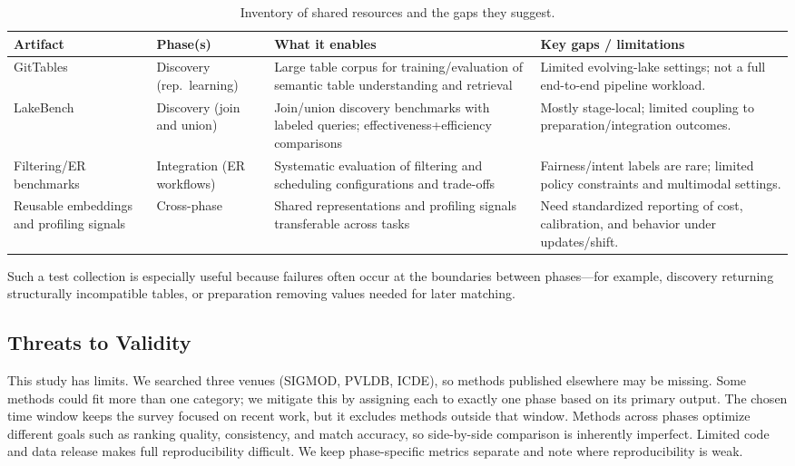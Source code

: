 \documentclass[sigconf]{acmart}
\newcommand{\tbl}{%
  \scriptsize
  \setlength{\tabcolsep}{4pt}%
  \renewcommand{\arraystretch}{1.12}%
}
\begin{document}
\begin{table}[!htbp]
\centering
\caption{Inventory of shared resources and the gaps they suggest.}
\label{tab:benchmark_inventory}
\tbl
\begin{tabularx}{\textwidth}{@{}p{26mm}p{26mm}Y Y@{}}
\toprule
\textbf{Artifact} & \textbf{Phase(s)} & \textbf{What it enables} & \textbf{Key gaps / limitations} \\
\midrule
GitTables~\cite{10.1145/3588710} &
Discovery (rep.\ learning) &
Large table corpus for training/evaluation of semantic table understanding and retrieval &
Limited evolving-lake settings; not a full end-to-end pipeline workload. \\
\addlinespace[0.25em]
LakeBench~\cite{10.14778/3659437.3659448} &
Discovery (join and union) &
Join/union discovery benchmarks with labeled queries; effectiveness+efficiency comparisons &
Mostly stage-local; limited coupling to preparation/integration outcomes. \\
\addlinespace[0.25em]
Filtering/ER benchmarks~\cite{10184692} &
Integration (ER workflows) &
Systematic evaluation of filtering and scheduling configurations and trade-offs &
Fairness/intent labels are rare; limited policy constraints and multimodal settings. \\
\addlinespace[0.25em]
Reusable embeddings~\cite{10184556} and profiling signals~\cite{10.1145/3588929} &
Cross-phase &
Shared representations and profiling signals transferable across tasks &
Need standardized reporting of cost, calibration, and behavior under updates/shift. \\
\bottomrule
\end{tabularx}
\end{table}

Such a test collection is especially useful because failures often occur at the boundaries between phases---for example, discovery returning structurally incompatible tables, or preparation removing values needed for later matching.

\subsection{Threats to Validity}
This study has limits. We searched three venues (SIGMOD, PVLDB, ICDE), so methods published elsewhere may be missing. Some methods could fit more than one category; we mitigate this by assigning each to exactly one phase based on its primary output. The chosen time window keeps the survey focused on recent work, but it excludes methods outside that window. Methods across phases optimize different goals such as ranking quality, consistency, and match accuracy, so side-by-side comparison is inherently imperfect. Limited code and data release makes full reproducibility difficult. We keep phase-specific metrics separate and note where reproducibility is weak.
\end{document}
